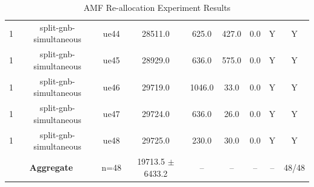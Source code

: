 \begin{table}[ht]
\begin{tabular}{|c|c|c|c|c|c|c|c|c|}
1 & split-gnb-simultaneous & ue44 & 28511.0 & 625.0 & 427.0 & 0.0 & Y & Y \\
1 & split-gnb-simultaneous & ue45 & 28929.0 & 636.0 & 575.0 & 0.0 & Y & Y \\
1 & split-gnb-simultaneous & ue46 & 29719.0 & 1046.0 & 33.0 & 0.0 & Y & Y \\
1 & split-gnb-simultaneous & ue47 & 29724.0 & 636.0 & 26.0 & 0.0 & Y & Y \\
1 & split-gnb-simultaneous & ue48 & 29725.0 & 230.0 & 30.0 & 0.0 & Y & Y \\
\multicolumn{2}{|c|}{\textbf{Aggregate}} & n=48 & 19713.5 $\pm$ 6433.2 & -- & -- & -- & -- & 48/48 \\
\hline
\end{tabular}
\caption{AMF Re-allocation Experiment Results}
\label{tab:amf_realloc}
\end{table}
